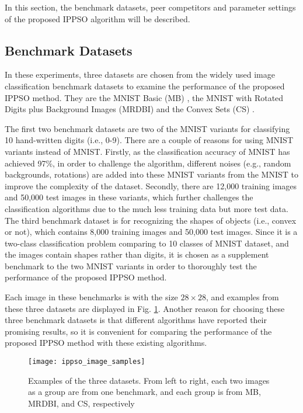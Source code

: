 \documentclass[conference]{IEEEtran}
\begin{document}
In this section, the benchmark datasets, peer competitors and parameter settings of the proposed IPPSO algorithm will be described.


\subsection{Benchmark Datasets}\label{sec:EPDatasets}

In these experiments, three datasets are chosen from the widely used image classification benchmark datasets to examine the performance of the proposed IPPSO method. They are the MNIST Basic (MB) \cite{DeepArchitectureEval:Larochelle}, the MNIST with Rotated Digits plus Background Images (MRDBI) \cite{DeepArchitectureEval:Larochelle} and the Convex Sets (CS) \cite{DeepArchitectureEval:Larochelle}.

The first two benchmark datasets are two of the MNIST \cite{DocumentRecognition:LeCun} variants for classifying 10 hand-written digits (i.e., 0-9). There are a couple of reasons for using MNIST variants instead of MNIST. Firstly, as the classification accuracy of MNIST has achieved 97\%, in order to challenge the algorithm, different noises (e.g., random backgrounds, rotations) are added into these MNIST variants from the MNIST to improve the complexity of the dataset. Secondly, there are 12,000 training images and 50,000 test images in these variants, which further challenges the classification algorithms due to the much less training data but more test data. The third benchmark dataset is for recognizing the shapes of objects (i.e., convex or not), which contains 8,000 training images and 50,000 test images. Since it is a two-class classification problem comparing to 10 classes of MNIST dataset, and the images contain shapes rather than digits, it is chosen as a supplement benchmark to the two MNIST variants in order to thoroughly test the performance of the proposed IPPSO method.

Each image in these benchmarks is with the size $28 \times 28$, and examples from these three datasets are displayed in Fig. \ref{fig:images}. Another reason for choosing these three benchmark datasets is that different algorithms have reported their promising results, so it is convenient for comparing the performance of the proposed IPPSO method with these existing algorithms.

\begin{figure}[!t]
	\centering
	\texttt{[image: ippso\_image\_samples]}
	\caption{Examples of the three datasets. From left to right, each two images as a group are from one benchmark, and each group is from MB, MRDBI, and CS, respectively}
	\label{fig:images}
\end{figure}
\end{document}
